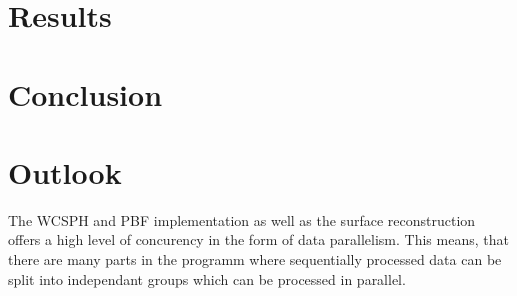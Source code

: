 \documentclass[11pt, letterpaper, twocolumn]{article}
\begin{document}


\section*{Results}
\label{sec:results}


\section*{Conclusion}
\label{sec:conclusion}



\section*{Outlook}
\label{sec:future}
The WCSPH and PBF implementation as well as the surface reconstruction offers a high level of concurency in the form of data parallelism. This means, that there are many parts in the programm where sequentially processed data can be split into independant groups which can be processed in parallel.





{\footnotesize
}



\end{document}
